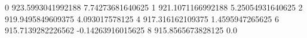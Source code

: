 0 923.5993041992188 7.74273681640625
1 921.1071166992188 5.25054931640625
2 919.9495849609375 4.093017578125
4 917.316162109375 1.4595947265625
6 915.7139282226562 -0.14263916015625
8 915.8565673828125 0.0
